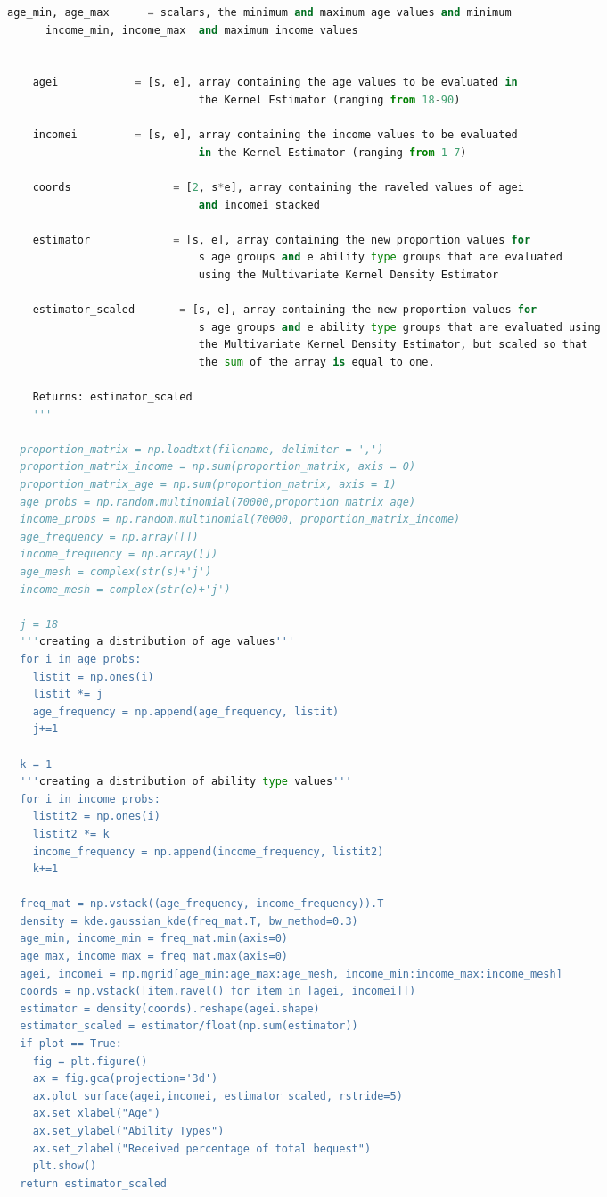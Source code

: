 \documentclass[letterpaper,12pt]{article}
\theoremstyle{definition}
\begin{document}
\begin{spacing}{1.5}
\begin{lstlisting}[language=Python, caption=MVKDE.py]
    age_min, age_max      = scalars, the minimum and maximum age values and minimum 
      income_min, income_max  and maximum income values 
    

    agei            = [s, e], array containing the age values to be evaluated in 
                              the Kernel Estimator (ranging from 18-90)

    incomei         = [s, e], array containing the income values to be evaluated 
                              in the Kernel Estimator (ranging from 1-7)

    coords                = [2, s*e], array containing the raveled values of agei 
                              and incomei stacked

    estimator             = [s, e], array containing the new proportion values for 
                              s age groups and e ability type groups that are evaluated 
                              using the Multivariate Kernel Density Estimator

    estimator_scaled       = [s, e], array containing the new proportion values for 
                              s age groups and e ability type groups that are evaluated using 
                              the Multivariate Kernel Density Estimator, but scaled so that 
                              the sum of the array is equal to one.

    Returns: estimator_scaled
    '''

  proportion_matrix = np.loadtxt(filename, delimiter = ',')
  proportion_matrix_income = np.sum(proportion_matrix, axis = 0)
  proportion_matrix_age = np.sum(proportion_matrix, axis = 1)
  age_probs = np.random.multinomial(70000,proportion_matrix_age)
  income_probs = np.random.multinomial(70000, proportion_matrix_income)
  age_frequency = np.array([])
  income_frequency = np.array([])
  age_mesh = complex(str(s)+'j')
  income_mesh = complex(str(e)+'j')

  j = 18
  '''creating a distribution of age values'''
  for i in age_probs:
    listit = np.ones(i)
    listit *= j
    age_frequency = np.append(age_frequency, listit)
    j+=1

  k = 1
  '''creating a distribution of ability type values'''
  for i in income_probs:
    listit2 = np.ones(i)
    listit2 *= k
    income_frequency = np.append(income_frequency, listit2)
    k+=1

  freq_mat = np.vstack((age_frequency, income_frequency)).T
  density = kde.gaussian_kde(freq_mat.T, bw_method=0.3)
  age_min, income_min = freq_mat.min(axis=0)
  age_max, income_max = freq_mat.max(axis=0)
  agei, incomei = np.mgrid[age_min:age_max:age_mesh, income_min:income_max:income_mesh]
  coords = np.vstack([item.ravel() for item in [agei, incomei]])
  estimator = density(coords).reshape(agei.shape)
  estimator_scaled = estimator/float(np.sum(estimator)) 
  if plot == True:
    fig = plt.figure()
    ax = fig.gca(projection='3d')
    ax.plot_surface(agei,incomei, estimator_scaled, rstride=5)
    ax.set_xlabel("Age")
    ax.set_ylabel("Ability Types")
    ax.set_zlabel("Received percentage of total bequest")
    plt.show()
  return estimator_scaled


\end{lstlisting}
\end{spacing}
\end{document}
